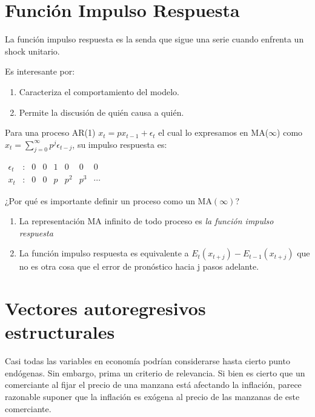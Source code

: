 \documentclass[
]{book}
\providecommand{\tightlist}{%
  \setlength{\itemsep}{0pt}\setlength{\parskip}{0pt}}
\begin{document}
\hypertarget{funciuxf3n-impulso-respuesta}{%
\section{Función Impulso Respuesta}\label{funciuxf3n-impulso-respuesta}}

La función impulso respuesta es la senda que sigue una serie cuando enfrenta un shock unitario.

Es interesante por:

\begin{enumerate}
\def\labelenumi{\arabic{enumi}.}
\tightlist
\item
  Caracteriza el comportamiento del modelo.
\item
  Permite la discusión de quién causa a quién.
\end{enumerate}

Para una proceso AR(1) \(x_{t}=p x_{t-1}+\epsilon_{t}\) el cual lo expresamos en MA(\(\infty\)) como \(x_{t}=\sum_{j=0}^{\infty}p^{j} \epsilon_{t-j}\), su impulso respuesta es:

\(\begin{array}{cccccccc} \epsilon_{t} &\colon &0&0&1&0&0&0 \\ x_{t} &\colon &0&0& p &p^{2}&p^{3}&\cdots \end{array}\)

¿Por qué es importante definir un proceso como un MA\((\infty)\)?

\begin{enumerate}
\def\labelenumi{\arabic{enumi}.}
\tightlist
\item
  La representación MA infinito de todo proceso es \emph{la función impulso respuesta}
\item
  La función impulso respuesta es equivalente a \(E_{t}(x_{t+j})-E_{t-1}(x_{t+j})\) que no es otra cosa que el error de pronóstico hacia j pasos adelante.
\end{enumerate}

\hypertarget{vectores-autoregresivos-estructurales}{%
\section{Vectores autoregresivos estructurales}\label{vectores-autoregresivos-estructurales}}

Casi todas las variables en economía podrían considerarse
hasta cierto punto endógenas. Sin embargo, prima un criterio de relevancia. Si bien es cierto que un comerciante al fijar el precio de una manzana está afectando la inflación, parece razonable suponer que la inflación es exógena al precio de las manzanas de este comerciante.
\end{document}
